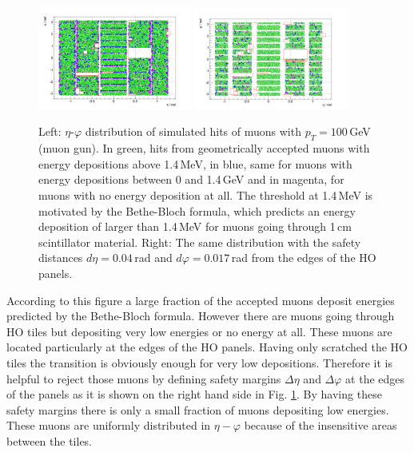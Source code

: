 			\begin{figure}[htbp]
				\centering
				\includegraphics[width=0.45\textwidth]{Figures/erdogan/simhits_wo_deta_dphi.png}
				\includegraphics[width=0.45\textwidth]{Figures/erdogan/simhits_with_deta_dphi.png}
				\caption{Left: $\eta$-$\varphi$ distribution of simulated hits of muons with $p_T = 100$\,GeV (muon gun). In green, hits from geometrically accepted muons with energy depositions above 1.4\,MeV, in
				blue, same for muons with energy depositions between 0 and 1.4\,GeV and in magenta, for muons with no energy deposition at all. The threshold at 1.4\,MeV is motivated by the Bethe-Bloch formula,
				which predicts an energy deposition of larger than 1.4\,MeV for muons going through 1\,cm scintillator material. Right: The same distribution with the safety distances $d\eta = 0.04$\,rad and
				$d\varphi = 0.017$\,rad from the edges of the HO panels.}
				\label{fig:simhits_in_acceptance}
			\end{figure}
			According to this figure a large fraction of the accepted muons deposit energies predicted by the Bethe-Bloch formula.
			However there are muons going through HO tiles but depositing very low energies or no energy at all.
			These muons are located particularly at the edges of the HO panels.
			Having only scratched the HO tiles the transition is obviously enough for very low depositions.
			Therefore it is helpful to reject those muons by defining safety margins $\Delta\eta$ and $\Delta\varphi$ at the edges of the panels as it is shown on the right hand side in Fig.
			\ref{fig:simhits_in_acceptance}.
			By having these safety margins there is only a small fraction of muons depositing low energies.
			These muons are uniformly distributed in $\eta-\varphi$ because of the insensitive areas between the tiles.
